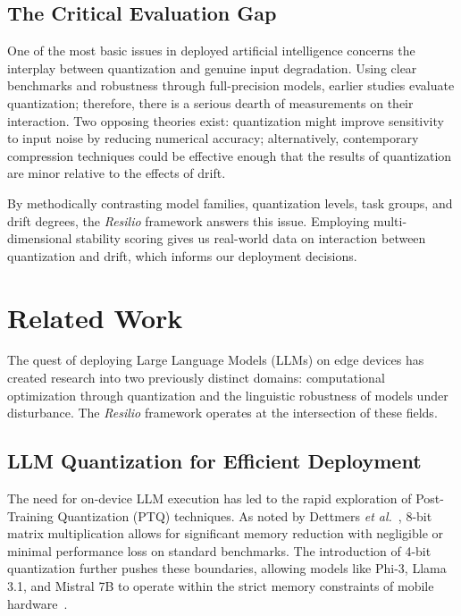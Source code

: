 \documentclass[conference]{IEEEtran}
\begin{document}
\subsection{The Critical Evaluation Gap}

One of the most basic issues in deployed artificial intelligence concerns the interplay between quantization and genuine input degradation. Using clear benchmarks and robustness through full-precision models, earlier studies evaluate quantization; therefore, there is a serious dearth of measurements on their interaction. Two opposing theories exist: quantization
 might improve sensitivity to input noise by reducing numerical accuracy; alternatively, contemporary compression techniques could be effective enough that the results of quantization are minor relative to the effects of drift.

By methodically contrasting model families, quantization levels, task groups, and drift degrees, the \textit{Resilio} framework answers this issue. Employing multi-dimensional stability scoring gives us real-world data on interaction between quantization and drift, which informs our deployment decisions.

\section{Related Work}

The quest of deploying Large Language Models (LLMs) on edge devices has created research into two previously distinct domains: computational optimization through quantization and the linguistic robustness of models under disturbance. The \textit{Resilio} framework operates at the intersection of these fields.

\subsection{LLM Quantization for Efficient Deployment}

The need for on-device LLM execution has led to the rapid exploration of Post-Training Quantization (PTQ) techniques. As noted by Dettmers \textit{et al.}~\cite{ref1}, 8-bit matrix multiplication allows for significant memory reduction with negligible or minimal performance loss on standard benchmarks. The introduction of 4-bit quantization further pushes these boundaries, allowing models like Phi-3, Llama 3.1, and Mistral 7B to operate within the strict memory constraints of mobile hardware~\cite{ref2, ref3, ref19}. 
\end{document}
